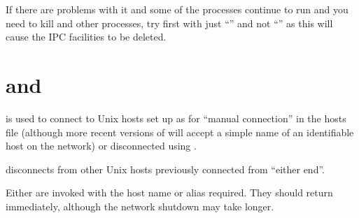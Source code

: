 If there are problems with it and some of the processes continue to run and you need to kill  and other
processes, try first with just ``'' and not ``'' as this
will cause the IPC facilities to be deleted.

\section{\BtconnName{} and \BtdisconnName}
\PrBtconn{} is used to connect to Unix hosts set up as for ``manual connection'' in the hosts file (although more recent versions
of \ProductName{} will accept a simple name of an identifiable host on the network) or disconnected using \PrBtdisconn{}.

\PrBtdisconn{} disconnects from other Unix hosts previously connected from ``either end''.

Either are invoked with the host name or alias required. They should return immediately, although the network shutdown may take longer.

